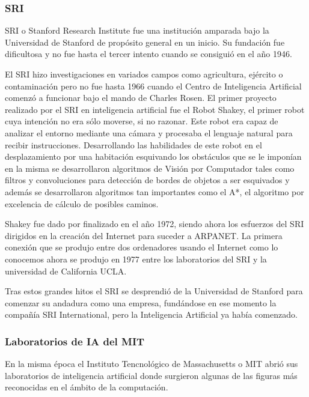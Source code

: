 \subsubsection{SRI}
SRI o Stanford Research Institute fue una institución amparada bajo la Universidad de Stanford de propósito general en un inicio. Su fundación fue dificultosa y no fue hasta el tercer intento cuando se consiguió en el año 1946.

\vspace{10px}

El SRI hizo investigaciones en variados campos como agricultura, ejército o contaminación pero no fue hasta 1966 cuando el Centro de Inteligencia Artificial comenzó a funcionar bajo el mando de Charles Rosen. El primer proyecto realizado por el SRI en inteligencia artificial fue el Robot Shakey, el primer robot cuya intención no era sólo moverse, si no razonar. Este robot era capaz de analizar el entorno mediante una cámara y procesaba el lenguaje natural para recibir instrucciones. Desarrollando las habilidades de este robot en el desplazamiento por una habitación esquivando los obstáculos que se le imponían en la misma se desarrollaron algoritmos de Visión por Computador tales como filtros y convoluciones para detección de bordes de objetos a ser esquivados y además se desarrollaron algoritmos tan importantes como el A*, el algoritmo por excelencia de cálculo de posibles caminos.

\vspace{10px}

Shakey fue dado por finalizado en el año 1972, siendo ahora los esfuerzos del SRI dirigidos en la creación del Internet para suceder a ARPANET. La primera conexión que se produjo entre dos ordenadores usando el Internet como lo conocemos ahora se produjo en 1977 entre los laboratorios del SRI y la universidad de California UCLA.

\vspace{10px}

Tras estos grandes hitos el SRI se desprendió de la Universidad de Stanford para comenzar su andadura como una empresa, fundándose en ese momento la compañía SRI International, pero la Inteligencia Artificial ya había comenzado.

\subsubsection{Laboratorios de IA del MIT}
En la misma época el Instituto Tencnológico de Massachusetts o MIT abrió sus laboratorios de inteligencia artificial donde surgieron algunas de las figuras más reconocidas en el ámbito de la computación.

